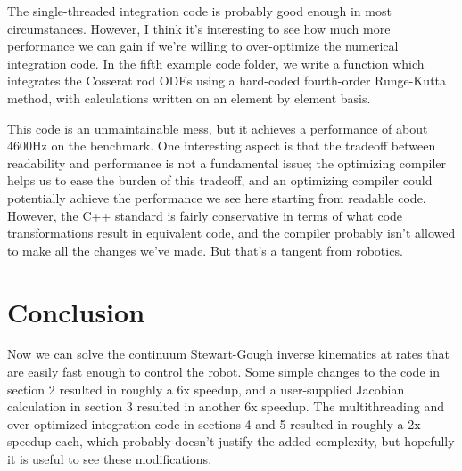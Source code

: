 \documentclass[12pt]{article}
\begin{document}
The single-threaded integration code is probably good enough in most circumstances. However, I think it's interesting to see how much more performance we can gain if we're willing to over-optimize the numerical integration code. In the fifth example code folder, we write a function which integrates the Cosserat rod ODEs using a hard-coded fourth-order Runge-Kutta method, with calculations written on an element by element basis.

This code is an unmaintainable mess, but it achieves a performance of about 4600Hz on the benchmark. One interesting aspect is that the tradeoff between readability and performance is not a fundamental issue; the optimizing compiler helps us to ease the burden of this tradeoff, and an optimizing compiler could potentially achieve the performance we see here starting from readable code. However, the C++ standard is fairly conservative in terms of what code transformations result in equivalent code, and the compiler probably isn't allowed to make all the changes we've made. But that's a tangent from robotics.


\section{Conclusion}

Now we can solve the continuum Stewart-Gough inverse kinematics at rates that are easily fast enough to control the robot. Some simple changes to the code in section 2 resulted in roughly a 6x speedup, and a user-supplied Jacobian calculation in section 3 resulted in another 6x speedup. The multithreading and over-optimized integration code in sections 4 and 5 resulted in roughly a 2x speedup each, which probably doesn't justify the added complexity, but hopefully it is useful to see these modifications.
\end{document}
